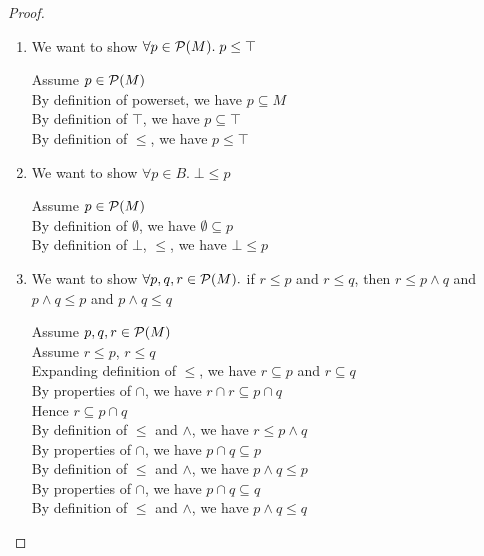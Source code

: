 \begin{proof}
\begin{enumerate}
\item  We want to show $\forall p \in \mathcal{P}(M).\; p \leq \top$
  \begin{tabbedproof}
        Assume $p \in \mathcal{P}(M)$ \\
    \oo By definition of powerset, we have $p \subseteq M$ \\
    \oo By definition of $\top$, we have $p \subseteq \top$ \\
    \oo By definition of $\leq$, we have $p \leq \top$ \\
  \end{tabbedproof}

\item We want to show $\forall p \in B.\; \bot \leq p$
  \begin{tabbedproof}
        Assume $p \in \mathcal{P}(M)$ \\ 
    \oo By definition of $\emptyset$, we have $\emptyset \subseteq p$ \\
    \oo By definition of $\bot$, $\leq$, we have $\bot \leq p$ \\
  \end{tabbedproof}

\item We want to show $\forall p,q,r \in \mathcal{P}(M).$ if $r \leq p$ and $r \leq q$, then
      $r \leq p \land q$ and 
      $p \land q \leq p$ and $p \land q \leq q$

   \begin{tabbedproof}
      Assume $p,q,r \in \mathcal{P}(M)$ \\
      Assume $r \leq p$, $r \leq q$ \\[1em]

      \oo Expanding definition of $\leq$, we have $r \subseteq p$ and $r \subseteq q$ \\
      \oo By properties of $\cap$, we have $r \cap r \subseteq p \cap q$ \\
      \oo Hence $r \subseteq p \cap q$ \\
      \oo By definition of $\leq$ and $\land$, we have $r \leq p \land q$ \\[1em]
      \oo By properties of $\cap$, we have $p \cap q \subseteq p$ \\
      \oo By definition of $\leq$ and $\land$, we have $p \wedge q \leq p$ \\[1em]
      \oo By properties of $\cap$, we have $p \cap q \subseteq q$ \\
      \oo By definition of $\leq$ and $\land$, we have $p \wedge q \leq q$ \\
   \end{tabbedproof}


\end{enumerate}
\end{proof}
